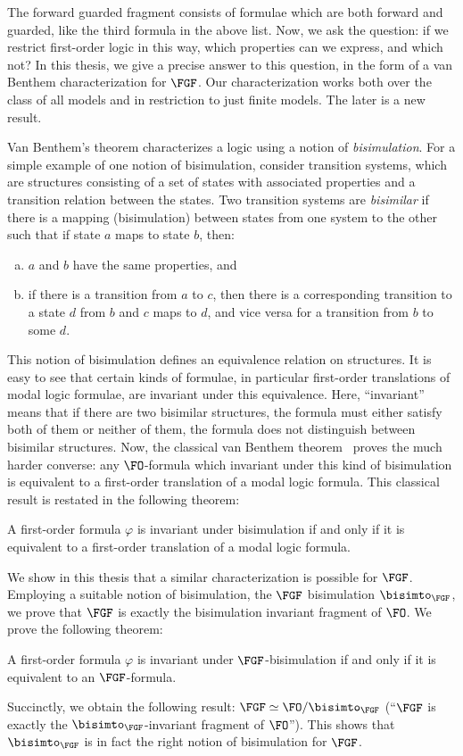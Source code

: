 The forward guarded fragment consists of formulae which are both forward and guarded, like the third formula in the above list.
Now, we ask the question: if we restrict first-order logic in this way, which properties can we express, and which not?
In this thesis, we give a precise answer to this question, in the form of a van Benthem characterization for $\FGF$.
Our characterization works both over the class of all models and in restriction to just finite models.
The later is a new result.

Van Benthem's theorem characterizes a logic using a notion of \emph{bisimulation}.
For a simple example of one notion of bisimulation, consider transition systems, which are structures consisting of a set of states with associated properties and a transition relation between the states.
Two transition systems are \emph{bisimilar} if there is a mapping (bisimulation) between states from one system to the other such that if state $a$ maps to state $b$, then:
\begin{enumerate}[(a)]
  \item $a$ and $b$ have the same properties, and
  \item if there is a transition from $a$ to $c$, then there is a corresponding transition to a state $d$ from $b$ and $c$ maps to $d$, and vice versa for a transition from $b$ to some $d$.
\end{enumerate}
This notion of bisimulation defines an equivalence relation on structures.
It is easy to see that certain kinds of formulae, in particular first-order translations of modal logic formulae, are invariant under this equivalence.
Here, ``invariant'' means that if there are two bisimilar structures, the formula must either satisfy both of them or neither of them, \ie{} the formula does not distinguish between bisimilar structures.
Now, the classical van Benthem theorem~\cite{van1983modal} proves the much harder converse: any $\FO$-formula which invariant under this kind of bisimulation is equivalent to a first-order translation of a modal logic formula.
This classical result is restated in the following theorem:
\begin{theorem}
  A first-order formula $\varphi$ is invariant under bisimulation if and only if it is equivalent to a first-order translation of a modal logic formula.
\end{theorem}

We show in this thesis that a similar characterization is possible for $\FGF$.
Employing a suitable notion of bisimulation, the $\FGF$ bisimulation $\bisimto_{\FGF}$, we prove that $\FGF$ is exactly the bisimulation invariant fragment of $\FO$.
We prove the following theorem:
\begin{theorem}\label{thm:invariance-iff-fgf}
  A first-order formula $\varphi$ is invariant under $\FGF$-bisimulation if and only if it is equivalent to an $\FGF$-formula.
\end{theorem}
Succinctly, we obtain the following result: $\FGF \simeq \FO/{\bisimto_{\FGF}}$ (``$\FGF$ is exactly the $\bisimto_{\FGF}$-invariant fragment of $\FO$'').
This shows that $\bisimto_{\FGF}$ is in fact the right notion of bisimulation for $\FGF$.

